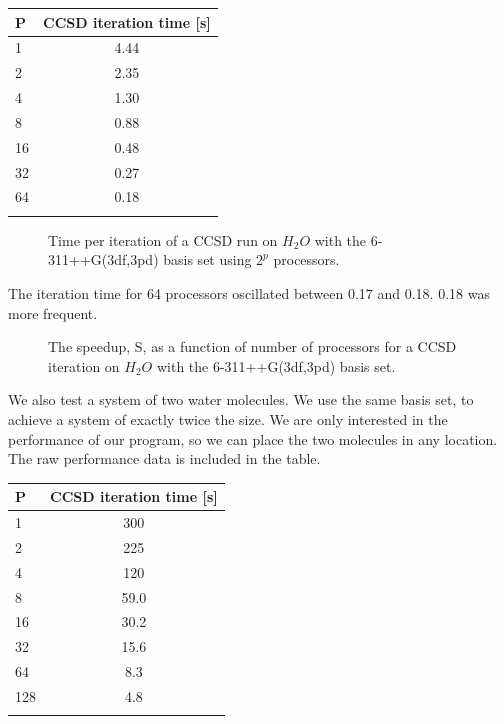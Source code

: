 \documentclass[a4paper,norsk,11pt,twoside]{report}
\begin{document}
\begin{center}
\begin{tabular}{ l c}
	\hline
  	P & CCSD iteration time [s] \\ \hline
  	1 & 4.44  \\ 
  	2 & 2.35   \\ 
  	4 & 1.30   \\
  	8 & 0.88    \\ 
  	16 & 0.48   \\ 
  	32 & 0.27   \\ 
  	64 & 0.18   \\ \hline
  	\\
	\end{tabular}
\end{center}

\begin{figure}[h!]
\begin{center}
\caption{Time per iteration of a CCSD run on $H_2O$ with the 6-311++G(3df,3pd) basis set using $2^p$ processors.}
\label{fig:ccsd_h2o_time_per_iter}
\end{center}
\end{figure}

\newpage

The iteration time for 64 processors oscillated between 0.17 and 0.18. 0.18 was more frequent. \\

\begin{figure}[h!]
\begin{center}
\caption{The speedup, S, as a function of number of processors for a CCSD iteration on $H_2O$ with the 6-311++G(3df,3pd) basis set.}
\label{fig:ccsd_h2o_time_speedup}
\end{center}
\end{figure}

We also test a system of two water molecules. We use the same basis set, to achieve a system of exactly twice the size. We are only interested in the performance of our program, so we can place the two molecules in any location. The raw performance data is included in the table.

\begin{center}
\begin{tabular}{ l c}
	\hline
  	P & CCSD iteration time [s] \\ \hline
  	1 & 300   \\ 
  	2 & 225   \\ 
  	4 & 120   \\
  	8 &  59.0  \\ 
  	16 & 30.2   \\ 
  	32 & 15.6   \\ 
  	64 & 8.3  \\
  	128 & 4.8 \\ \hline
  	\\
	\end{tabular}
\end{center}
\end{document}
